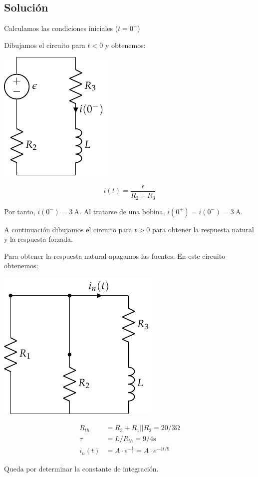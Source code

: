 \subsection*{Solución}

Calculamos las condiciones iniciales ($t = 0^-$)

Dibujamos el circuito para $t < 0$ y obtenemos:

\begin{minipage}{0.3\textwidth}
  \includegraphics{figuras/FM_4_2_t0-}
\end{minipage}
\begin{minipage}{0.7\textwidth}
  \begin{equation*}
    i(t) = \frac{\epsilon}{R_2 + R_3}
  \end{equation*}
\end{minipage}

Por tanto, $i(0^-) = \SI{3}{\ampere}$. Al tratarse de una bobina,
$i(0^+) = i(0^-) = \SI{3}{\ampere}$.

A continuación dibujamos el circuito para $t > 0$ para obtener la
respuesta natural y la respuesta forzada.

Para obtener la respuesta natural apagamos las fuentes. En este
circuito obtenemos:

\begin{minipage}{0.3\textwidth}
  \includegraphics{figuras/FM_4_2_natural}
\end{minipage}
\begin{minipage}{0.7\textwidth}
  \begin{align*}
    R_{th} &= R_3 + R_1||R_2 = 20/3\si{\ohm}\\
    \tau &= L/R_{th} = 9/4\si{\second}\\
    i_n(t) &= A \cdot e^{-\frac{t}{\tau}} = A \cdot e^{-4t/9}
  \end{align*}
\end{minipage}
Queda por determinar la constante de integración.

